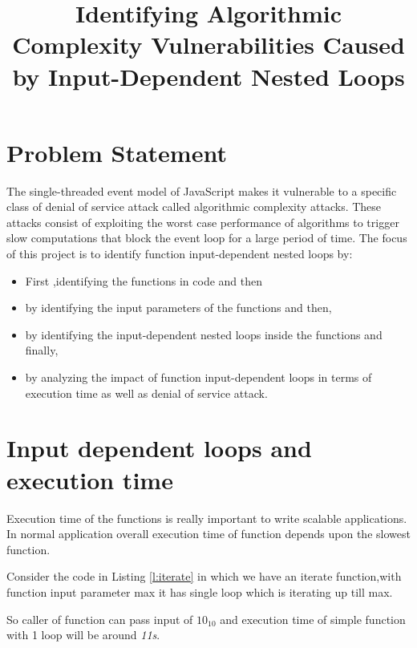 \documentclass[authoryear,preprint]{sigplanconf}
\begin{document}
\setlength{\pdfpageheight}{\paperheight}
\setlength{\pdfpagewidth}{\paperwidth}


\title{Identifying Algorithmic Complexity Vulnerabilities Caused by
Input-Dependent Nested Loops}

\maketitle

\section{Problem Statement}
\label{sec:problemstatement}

The single-threaded event model of JavaScript makes it vulnerable
to a specific class of denial of service attack called algorithmic
complexity attacks. These attacks consist of exploiting the worst
case performance of algorithms to trigger slow computations that
block the event loop for a large period of time. The focus of this
project is to identify function input-dependent nested loops by:
\begin{itemize}
\item First ,identifying the functions in code and then
\item by identifying the input parameters of the functions and then,
\item by identifying the input-dependent nested loops inside the functions and finally,
\item by analyzing the impact of function input-dependent loops in terms
of execution time as well as denial of service attack.
\end{itemize}


\section{Input dependent loops and execution time}
\label{sec:introduction}
Execution time of the functions is really important to write scalable applications. In normal application overall execution time of function depends upon the slowest function.

Consider the code in Listing \ref{l:iterate} in which we have an iterate function,with function input parameter max it has single loop which is iterating up till max.

So caller of function can pass input of \begin{math} 10_{10} \end{math} and execution time of simple function with 1 loop will be around \textit{11s}.
\end{document}
